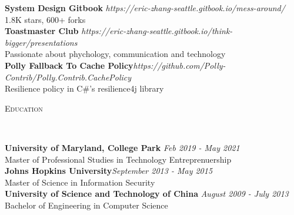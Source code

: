 \documentclass[3pt]{article}
\newenvironment{changemargin}[2]{%
  \begin{list}{}{%
    \setlength{\topsep}{0pt}%
    \setlength{\leftmargin}{#1}%
    \setlength{\rightmargin}{#2}%
    \setlength{\listparindent}{\parindent}%
    \setlength{\itemindent}{\parindent}%
    \setlength{\parsep}{\parskip}%
  }%
  \item[]}{\end{list}
}
\newcommand{\lineover}{
	\begin{changemargin}{-0.05in}{-0.05in}
		\vspace*{-8pt}
		\hrulefill \\
		\vspace*{-2pt}
	\end{changemargin}
}
\newcommand{\header}[1]{
	\begin{changemargin}{-0.5in}{-0.5in}
		{\Large \scshape{#1}}\\
  	\lineover
	\end{changemargin}
}
\newenvironment{body} {
	\vspace*{-16pt}
	\begin{changemargin}{-0.25in}{-0.5in}
  }	
	{\end{changemargin}
}
\begin{document}
\begin{body}
	\vspace{17pt}
	\textbf{System Design Gitbook} \hfill \emph{https://eric-zhang-seattle.gitbook.io/mess-around/} \\
	1.8K stars, 600+ forks\\
  \smallskip
	\textbf{Toastmaster Club} \hfill \emph{https://eric-zhang-seattle.gitbook.io/think-bigger/presentations} \\
	Passionate about phychology,  communication and technology\\
 \smallskip
	\textbf{Polly Fallback To Cache Policy}{}\hfill \emph{https://github.com/Polly-Contrib/Polly.Contrib.CachePolicy}{} \\
	Resilience policy in C\#'s resilience4j library \hfill \\
\end{body}

\bigskip

\header{Education}

\begin{body}
	\vspace{17pt}
	\textbf{University of Maryland, College Park} \hfill \emph{Feb 2019 - May 2021} \\
	Master of Professional Studies in Technology Entreprenuership \\
  \smallskip
	\textbf{Johns Hopkins University}{}\hfill \emph{September 2013 - May 2015}{} \\
	Master of Science in Information Security \hfill \\
  \smallskip
	\textbf{University of Science and Technology of China} \hfill \emph{August 2009 - July 2013} \\
	Bachelor of Engineering in Computer Science \\
\end{body}



%	
\end{document}

